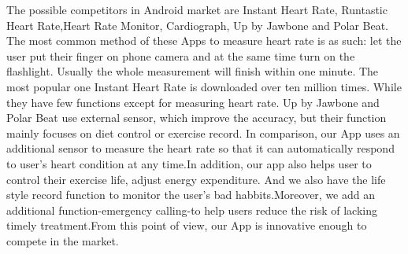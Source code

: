 
The possible competitors in Android market are Instant Heart Rate, Runtastic Heart Rate,Heart Rate Monitor, Cardiograph, Up by Jawbone and Polar Beat. The most common method of these Apps to measure heart rate is as such: let the user put their finger on phone camera and at the same time turn on the flashlight. Usually the whole measurement will finish within one minute. The most popular one Instant Heart Rate is downloaded over ten million times. While they have few functions except for measuring heart rate. Up by Jawbone and Polar Beat use external sensor, which improve the accuracy, but their function mainly focuses on diet control or exercise record.  In comparison, our App uses an additional sensor to measure the heart rate so that it can automatically respond to user's heart condition at any time.In addition, our app also helps user to control their exercise life, adjust energy expenditure. And we also have the life style record function to monitor the user's bad habbits.Moreover, we add an additional function-emergency calling-to help users reduce the risk of lacking timely treatment.From this point of view, our App is innovative enough to compete in the market.  
